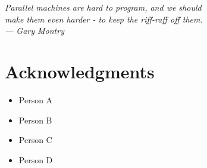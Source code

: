 
\begin{flushright}{\slshape
    Parallel machines are hard to program, and we should\\
    make them even harder - to keep the riff-raff off them.\\ \medskip
    ---  Gary Montry}  %
\end{flushright}

\bigskip

\begingroup
\let\clearpage\relax
\let\cleardoublepage\relax
\let\cleardoublepage\relax
\chapter*{Acknowledgments}
\bigskip

\begin{itemize} %
\item Person A %
\item Person B %
\item Person C %
\item Person D %
\end{itemize}
\endgroup
